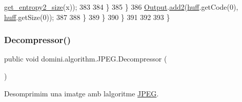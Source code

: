 \begin{DoxyCode}
      \hyperlink{classdomini_1_1algorithm_1_1JPEG_aa9bc9bee7181efee254be843e23ee2c6}{get\_entropy2\_size}(x));
383                             
384                         \}
385                     \}
386                     \hyperlink{classdomini_1_1algorithm_1_1Algorithm_a4de9955411c656325adc391ef570c082}{Output}.\hyperlink{classpersistencia_1_1output_1_1Ctrl__Output_ad4738467c2312b0e079c14003e548dd6}{add2}(\hyperlink{classdomini_1_1algorithm_1_1JPEG_aacc6445baa7819e3f9139ffb78e0b8f4}{huff}.getCode(0), \hyperlink{classdomini_1_1algorithm_1_1JPEG_aacc6445baa7819e3f9139ffb78e0b8f4}{huff}.getSize(0));
387 
388                 \}
389             \}
390         \}
391 
392         
393     \}
\end{DoxyCode}
\mbox{\label{classdomini_1_1algorithm_1_1JPEG_accca347e84e41b254d1f4a7bbdf2201a}} 
\subsubsection{\texorpdfstring{Decompressor()}{Decompressor()}}
{\footnotesize\ttfamily public void domini.\+algorithm.\+J\+P\+E\+G.\+Decompressor (\begin{DoxyParamCaption}{ }\end{DoxyParamCaption})\hspace{0.3cm}{\ttfamily [inline]}}



Desomprimim una imatge amb l\textquotesingle{}algoritme \hyperlink{classdomini_1_1algorithm_1_1JPEG}{J\+P\+EG}. 


